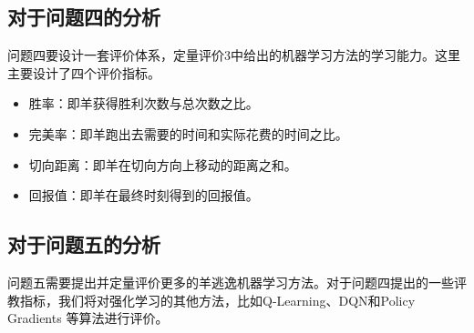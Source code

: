 \subsection{对于问题四的分析}
问题四要设计一套评价体系，定量评价3中给出的机器学习方法的学习能力。这里主要设计了四个评价指标。
\begin{itemize}[nosep]
    \item 胜率：即羊获得胜利次数与总次数之比。
    \item 完美率：即羊跑出去需要的时间和实际花费的时间之比。
    \item 切向距离：即羊在切向方向上移动的距离之和。
    \item 回报值：即羊在最终时刻得到的回报值。
\end{itemize}
\subsection{对于问题五的分析}
问题五需要提出并定量评价更多的羊逃逸机器学习方法。对于问题四提出的一些评教指标，我们将对强化学习的其他方法，比如Q-Learning、DQN和Policy Gradients 等算法进行评价。

